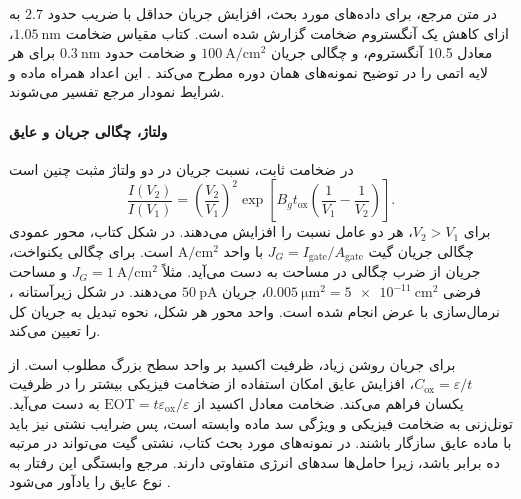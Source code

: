در متن مرجع، برای داده‌های مورد بحث، افزایش جریان حداقل با ضریب
حدود \(2.7\) به ازای کاهش یک آنگستروم ضخامت گزارش شده است.
کتاب مقیاس ضخامت \(\qty{1.05}{\nano\metre}\)، معادل \num{10.5} آنگستروم، و چگالی جریان
\(\qty{100}{\ampere\per\centi\metre\squared}\) و ضخامت حدود
\(\qty{0.3}{\nano\metre}\) برای هر لایه اتمی  را در توضیح
نمونه‌های همان دوره مطرح می‌کند \cite[صفحه ۸۳]{weste}.
این اعداد همراه ماده و شرایط نمودار مرجع تفسیر می‌شوند.

\paragraph*{ولتاژ، چگالی جریان و عایق }
در ضخامت ثابت، نسبت جریان در دو ولتاژ مثبت چنین است
\begin{equation}
 \frac{I(V_2)}{I(V_1)}=
 \left(\frac{V_2}{V_1}\right)^2
 \exp\!\left[B_gt_{\mathrm{ox}}
 \left(\frac{1}{V_1}-\frac{1}{V_2}\right)\right].
 \label{eq:gate-voltage-ratio}
\end{equation}
برای \(V_2>V_1\)، هر دو عامل نسبت را افزایش می‌دهند.
در شکل  کتاب، محور عمودی چگالی جریان گیت
\(J_G=I_{\mathrm{gate}}/A_{\mathrm{gate}}\) با واحد
\(\unit{\ampere\per\centi\metre\squared}\) است.
برای چگالی یکنواخت، جریان از ضرب چگالی در مساحت به دست می‌آید.
مثلاً \(J_G=\qty{1}{\ampere\per\centi\metre\squared}\) و مساحت
فرضی \(\qty{0.005}{\micro\metre\squared}
=\qty{5e-11}{\centi\metre\squared}\)، جریان
\(\qty{50}{\pico\ampere}\) می‌دهند.
در شکل زیرآستانه ، نرمال‌سازی با عرض انجام شده است.
واحد محور هر شکل، نحوه تبدیل به جریان کل را تعیین می‌کند.

برای جریان روشن زیاد، ظرفیت اکسید بر واحد سطح بزرگ مطلوب است.
از \(C_{\mathrm{ox}}=\varepsilon/t\)، افزایش  عایق
امکان استفاده از ضخامت فیزیکی بیشتر را در ظرفیت یکسان فراهم می‌کند.
ضخامت معادل اکسید از \(\mathrm{EOT}=t\varepsilon_{\mathrm{ox}}/
\varepsilon\) به دست می‌آید. تونل‌زنی به ضخامت فیزیکی و ویژگی سد
ماده وابسته است، پس ضرایب نشتی نیز باید با ماده عایق سازگار باشند.
در نمونه‌های  مورد بحث کتاب، نشتی گیت  می‌تواند
در مرتبه ده برابر  باشد، زیرا حامل‌ها سدهای انرژی متفاوتی
دارند. مرجع وابستگی این رفتار به نوع عایق را یادآور می‌شود
\cite[صفحه ۸۳]{weste}.

\subsubsection{}
\label{sec:junction-leakage}
